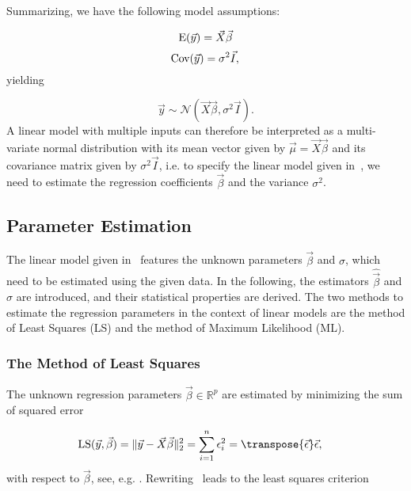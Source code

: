 Summarizing, we have the following model assumptions:

\begin{equation}
	\text{E}(\vec{y}) = \vec{X} \vec{\beta} \\
\end{equation}
\begin{equation}
	\text{Cov} (\vec{y}) = \sigma^2 \vec{I}, \\
\end{equation}
%	
yielding 

\begin{equation} \label{eq:linModelAsDistribution}
	\vec{y} \sim \mathcal N(\vec{X} \vec{\beta}, \sigma^2 \vec{I}).
\end{equation}
%
A linear model with multiple inputs can therefore be interpreted as a multi-variate normal distribution with its mean vector given by $\vec{\mu} = \vec{X} \vec{\beta}$ and its covariance matrix given by $\sigma^2 \vec{I}$, i.e. to specify the linear model given in~, we need to estimate the regression coefficients $\vec{\beta}$ and the variance $\sigma^2$.

\subsection{Parameter Estimation}

The linear model given in~ features the unknown parameters $\vec{\beta}$ and $\sigma$, which need to be estimated using the given data. In the following, the estimators $\hat{\vec{\beta}}$ and $\hat \sigma$ are introduced, and their statistical properties are derived. The two methods to estimate the regression parameters in the context of linear models are the method of Least Squares (LS) and the method of Maximum Likelihood (ML).  

\subsubsection{The Method of Least Squares} \label{subsubsec:Method-of-LS}

The unknown regression parameters $\vec{\beta} \in \mathbb{R}^p$ are estimated by minimizing the sum of squared error

\begin{align} \label{eq:MethodOfLS} 
	\text{LS}(\vec{y}, \vec{\beta}) &=  \lVert \vec{y} - \vec{X} \vec{\beta} \rVert^2_2 = \sum_{i=1}^n\epsilon_i^2 = \transpose{\vec{\epsilon}} \vec{\epsilon},
\end{align}
%
with respect to $\vec{\beta}$, see, e.g. \cite{friedman2001elements}. Rewriting~ leads to the least squares criterion


